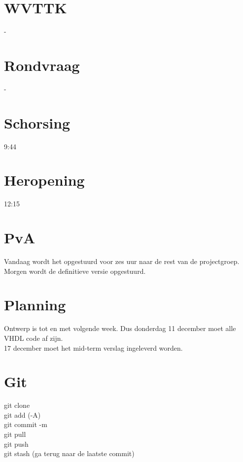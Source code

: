 \documentclass[11pt,twoside,a4paper]{article}
\begin{document}
\section{WVTTK}
-

\section{Rondvraag}
-

\section{Schorsing}
9:44

\section{Heropening}
12:15

\section{PvA}
Vandaag wordt het opgestuurd voor zes uur naar de rest van de projectgroep. Morgen wordt de definitieve versie opgestuurd.

\section{Planning}
Ontwerp is tot en met volgende week. Dus donderdag 11 december moet alle VHDL code af zijn.\\
17 december moet het mid-term verslag ingeleverd worden.

\section{Git}
git clone\\
git add (-A)\\
git commit -m\\
git pull\\
git push\\
git stash (ga terug naar de laatste commit)
\end{document}
